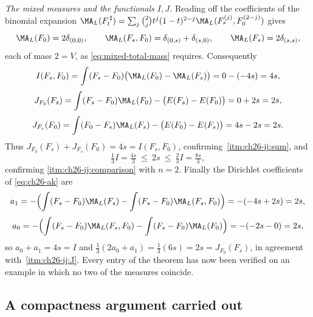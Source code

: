 \begin{example}
\emph{The mixed measures and the functionals \(I,J\).}  Reading off the
coefficients of the binomial expansion
\(\MA_L(F^{\,\sharp}_t)=\sum_j\binom2jt^j(1-t)^{2-j}
\MA_L(F_s^{(j)},F_0^{(2-j)})\) gives
\[
 \MA_L(F_0)=2\delta_{(0,0)},\qquad
 \MA_L(F_s,F_0)=\delta_{(0,s)}+\delta_{(s,0)},\qquad
 \MA_L(F_s)=2\delta_{(s,s)},
\]
each of mass \(2=V\), as \eqref{eq:mixed-total-mass} requires.  Consequently
\[
 I(F_s,F_0)=\int(F_s-F_0)\bigl(\MA_L(F_0)-\MA_L(F_s)\bigr)
 =0-(-4s)=4s,
\]
\[
 J_{F_0}(F_s)=\int(F_s-F_0)\MA_L(F_0)-\bigl(E(F_s)-E(F_0)\bigr)
 =0+2s=2s,
\]
\[
 J_{F_s}(F_0)=\int(F_0-F_s)\MA_L(F_s)-\bigl(E(F_0)-E(F_s)\bigr)
 =4s-2s=2s .
\]
Thus \(J_{F_0}(F_s)+J_{F_s}(F_0)=4s=I(F_s,F_0)\), confirming
\,\cref{itm:ch26-ij:sum}, and
\[
 \tfrac13I=\tfrac{4s}{3}\ \leq\ 2s\ \leq\ \tfrac23I=\tfrac{8s}{3},
\]
confirming \cref{itm:ch26-ij:comparison} with \(n=2\).  Finally the Dirichlet
coefficients of \eqref{eq:ch26-ak} are
\[
 a_1=-\Bigl(\int(F_s-F_0)\MA_L(F_s)
   -\int(F_s-F_0)\MA_L(F_s,F_0)\Bigr)=-(-4s+2s)=2s,
\]
\[
 a_0=-\Bigl(\int(F_s-F_0)\MA_L(F_s,F_0)
   -\int(F_s-F_0)\MA_L(F_0)\Bigr)=-(-2s-0)=2s,
\]
so \(a_0+a_1=4s=I\) and
\(\tfrac13(2a_0+a_1)=\tfrac13(6s)=2s=J_{F_0}(F_s)\), in agreement with
\,\cref{itm:ch26-ij:J}.  Every entry of
the theorem has now been verified on an example in which no two of the
measures coincide.
\end{example}

\subsection{A compactness argument carried out}
\label{sec:ch26-ex-compactness}

